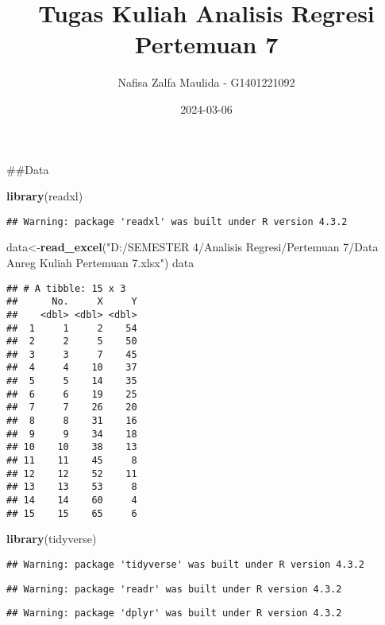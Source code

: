 \documentclass[
]{article}
\title{Tugas Kuliah Analisis Regresi Pertemuan 7}
\author{Nafisa Zalfa Maulida - G1401221092}
\date{2024-03-06}
\newenvironment{Shaded}{\begin{snugshade}}{\end{snugshade}}
\newcommand{\FunctionTok}[1]{\textcolor[rgb]{0.13,0.29,0.53}{\textbf{#1}}}
\newcommand{\NormalTok}[1]{#1}
\newcommand{\OtherTok}[1]{\textcolor[rgb]{0.56,0.35,0.01}{#1}}
\newcommand{\StringTok}[1]{\textcolor[rgb]{0.31,0.60,0.02}{#1}}
\begin{document}
\maketitle

\#\#Data

\begin{Shaded}
\begin{Highlighting}[]
\FunctionTok{library}\NormalTok{(readxl)}
\end{Highlighting}
\end{Shaded}

\begin{verbatim}
## Warning: package 'readxl' was built under R version 4.3.2
\end{verbatim}

\begin{Shaded}
\begin{Highlighting}[]
\NormalTok{data}\OtherTok{\textless{}{-}}\FunctionTok{read\_excel}\NormalTok{(}\StringTok{"D:/SEMESTER 4/Analisis Regresi/Pertemuan 7/Data Anreg Kuliah Pertemuan 7.xlsx"}\NormalTok{)}
\NormalTok{data}
\end{Highlighting}
\end{Shaded}

\begin{verbatim}
## # A tibble: 15 x 3
##      No.     X     Y
##    <dbl> <dbl> <dbl>
##  1     1     2    54
##  2     2     5    50
##  3     3     7    45
##  4     4    10    37
##  5     5    14    35
##  6     6    19    25
##  7     7    26    20
##  8     8    31    16
##  9     9    34    18
## 10    10    38    13
## 11    11    45     8
## 12    12    52    11
## 13    13    53     8
## 14    14    60     4
## 15    15    65     6
\end{verbatim}

\begin{Shaded}
\begin{Highlighting}[]
\FunctionTok{library}\NormalTok{(tidyverse)}
\end{Highlighting}
\end{Shaded}

\begin{verbatim}
## Warning: package 'tidyverse' was built under R version 4.3.2
\end{verbatim}

\begin{verbatim}
## Warning: package 'readr' was built under R version 4.3.2
\end{verbatim}

\begin{verbatim}
## Warning: package 'dplyr' was built under R version 4.3.2
\end{verbatim}
\end{document}
